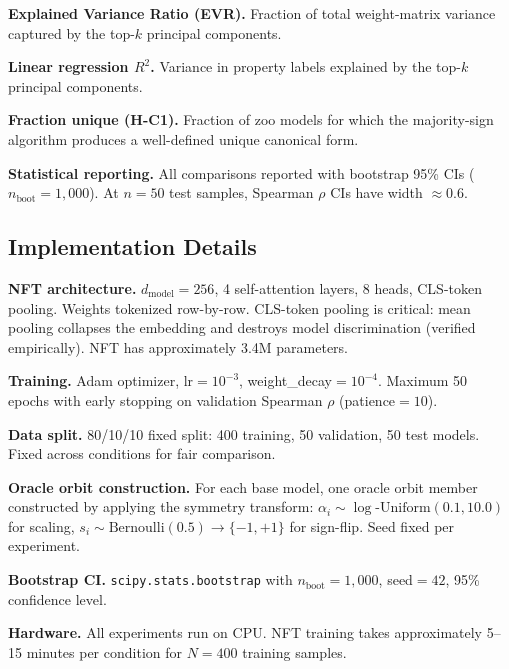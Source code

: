 \textbf{Explained Variance Ratio (EVR).} Fraction of total weight-matrix variance captured by the top-$k$ principal components.

\textbf{Linear regression $R^2$.} Variance in property labels explained by the top-$k$ principal components.

\textbf{Fraction unique (H-C1).} Fraction of zoo models for which the majority-sign algorithm produces a well-defined unique canonical form.

\textbf{Statistical reporting.} All comparisons reported with bootstrap 95\% CIs ($n_{\mathrm{boot}}=1{,}000$). At $n=50$ test samples, Spearman $\rho$ CIs have width $\approx 0.6$.

\subsection{Implementation Details}

\textbf{NFT architecture.} $d_{\mathrm{model}}=256$, 4 self-attention layers, 8 heads, CLS-token pooling. Weights tokenized row-by-row. CLS-token pooling is critical: mean pooling collapses the embedding and destroys model discrimination (verified empirically). NFT has approximately 3.4M parameters.

\textbf{Training.} Adam optimizer, lr$=10^{-3}$, weight\_decay$=10^{-4}$. Maximum 50 epochs with early stopping on validation Spearman $\rho$ (patience$=10$).

\textbf{Data split.} 80/10/10 fixed split: 400 training, 50 validation, 50 test models. Fixed across conditions for fair comparison.

\textbf{Oracle orbit construction.} For each base model, one oracle orbit member constructed by applying the symmetry transform: $\alpha_i \sim \log\text{-Uniform}(0.1, 10.0)$ for scaling, $s_i \sim \mathrm{Bernoulli}(0.5) \to \{-1, +1\}$ for sign-flip. Seed fixed per experiment.

\textbf{Bootstrap CI.} \texttt{scipy.stats.bootstrap} with $n_{\mathrm{boot}}=1{,}000$, seed$=42$, 95\% confidence level.

\textbf{Hardware.} All experiments run on CPU. NFT training takes approximately 5--15 minutes per condition for $N=400$ training samples.
